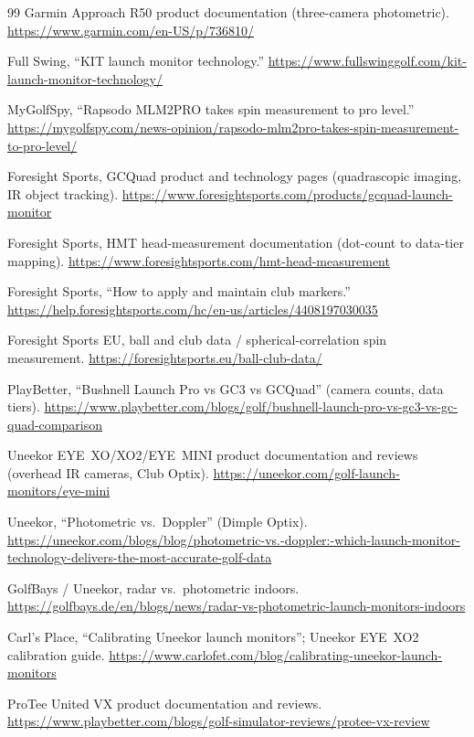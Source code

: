\begin{thebibliography}{99}
Garmin Approach R50 product documentation (three-camera photometric).
\url{https://www.garmin.com/en-US/p/736810/}

Full Swing, ``KIT launch monitor technology.''
\url{https://www.fullswinggolf.com/kit-launch-monitor-technology/}

MyGolfSpy, ``Rapsodo MLM2PRO takes spin measurement to pro level.''
\url{https://mygolfspy.com/news-opinion/rapsodo-mlm2pro-takes-spin-measurement-to-pro-level/}

Foresight Sports, GCQuad product and technology pages (quadrascopic
imaging, IR object tracking).
\url{https://www.foresightsports.com/products/gcquad-launch-monitor}

Foresight Sports, HMT head-measurement documentation (dot-count to
data-tier mapping). \url{https://www.foresightsports.com/hmt-head-measurement}

Foresight Sports, ``How to apply and maintain club markers.''
\url{https://help.foresightsports.com/hc/en-us/articles/4408197030035}

Foresight Sports EU, ball and club data / spherical-correlation spin
measurement. \url{https://foresightsports.eu/ball-club-data/}

PlayBetter, ``Bushnell Launch Pro vs GC3 vs GCQuad'' (camera counts,
data tiers).
\url{https://www.playbetter.com/blogs/golf/bushnell-launch-pro-vs-gc3-vs-gc-quad-comparison}

Uneekor EYE~XO/XO2/EYE~MINI product documentation and reviews (overhead
IR cameras, Club Optix). \url{https://uneekor.com/golf-launch-monitors/eye-mini}

Uneekor, ``Photometric vs.\ Doppler'' (Dimple Optix).
\url{https://uneekor.com/blogs/blog/photometric-vs.-doppler:-which-launch-monitor-technology-delivers-the-most-accurate-golf-data}

GolfBays / Uneekor, radar vs.\ photometric indoors.
\url{https://golfbays.de/en/blogs/news/radar-vs-photometric-launch-monitors-indoors}

Carl's Place, ``Calibrating Uneekor launch monitors''; Uneekor EYE~XO2
calibration guide.
\url{https://www.carlofet.com/blog/calibrating-uneekor-launch-monitors}

ProTee United VX product documentation and reviews.
\url{https://www.playbetter.com/blogs/golf-simulator-reviews/protee-vx-review}


\end{thebibliography}
